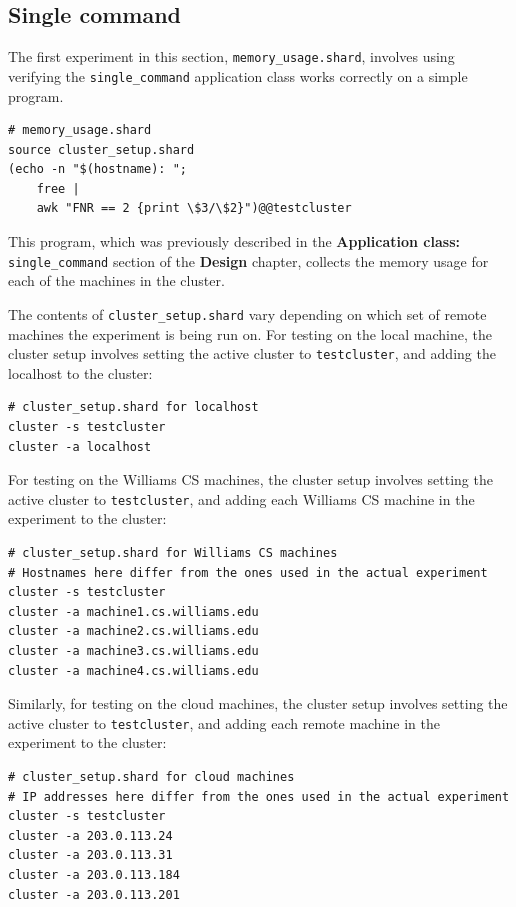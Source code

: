 \documentclass[twoside]{report}
\newcommand{\todoi}[1]{\todo[inline, color=blue!20]{TODO: {#1}}}
\begin{document}
\subsection{Single command}
\todoi{Compare to a simple SSH script}
\begin{sloppypar}
  The first experiment in this section, \texttt{memory\_usage.shard}, involves using verifying the \texttt{single\_command} application class works correctly on a simple program.
\end{sloppypar}
\begin{lstlisting}[language=Shard]
# memory_usage.shard
source cluster_setup.shard
(echo -n "$(hostname): ";
    free |
    awk "FNR == 2 {print \$3/\$2}")@@testcluster
\end{lstlisting}
This program, which was previously described in the \textbf{Application class: }\texttt{single\_command} section of the \textbf{Design} chapter, collects the memory usage for each of the machines in the cluster.

The contents of \texttt{cluster\_setup.shard} vary depending on which set of remote machines the experiment is being run on.
For testing on the local machine, the cluster setup involves setting the active cluster to \texttt{testcluster}, and adding the localhost to the cluster:
\begin{lstlisting}[language=Shard]
# cluster_setup.shard for localhost
cluster -s testcluster
cluster -a localhost
\end{lstlisting}
For testing on the Williams CS machines, the cluster setup involves setting the active cluster to \texttt{testcluster}, and adding each Williams CS machine in the experiment to the cluster:
\begin{lstlisting}[language=Shard]
# cluster_setup.shard for Williams CS machines
# Hostnames here differ from the ones used in the actual experiment
cluster -s testcluster
cluster -a machine1.cs.williams.edu
cluster -a machine2.cs.williams.edu
cluster -a machine3.cs.williams.edu
cluster -a machine4.cs.williams.edu
\end{lstlisting}
Similarly, for testing on the cloud machines, the cluster setup involves setting the active cluster to \texttt{testcluster}, and adding each remote machine in the experiment to the cluster:
\begin{lstlisting}[language=Shard]
# cluster_setup.shard for cloud machines
# IP addresses here differ from the ones used in the actual experiment
cluster -s testcluster
cluster -a 203.0.113.24
cluster -a 203.0.113.31
cluster -a 203.0.113.184
cluster -a 203.0.113.201
\end{lstlisting}
\end{document}
